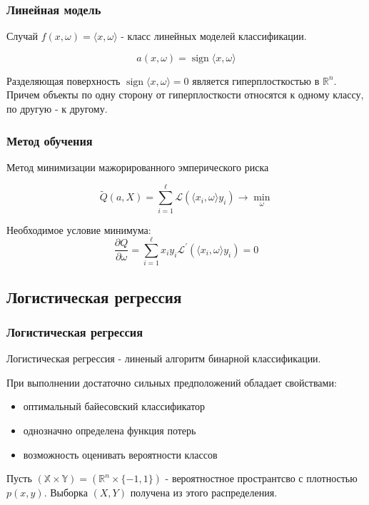 \documentclass{beamer}
\DeclareMathOperator{\sign}{sign}
\begin{document}
	\begin{frame}
		\frametitle{Линейная модель}
		
		Случай $f(x, \omega) = \langle x, \omega \rangle$ - класс линейных моделей классификации.
		
		\[
		a(x, \omega) = \sign \langle x, \omega \rangle
		\]
		
		Разделяющая поверхность $\sign \langle x, \omega \rangle = 0$ является гиперплосткостью в $\mathbb{R}^{n}$. Причем объекты по одну сторону от гиперплосткости относятся к одному классу, по другую - к другому.
	\end{frame}
	
	\begin{frame}
		\frametitle{Метод обучения}
		Метод минимизации мажорированного эмперического риска 
		
		\[
		\widetilde{Q}(a, X) = \sum_{i=1}^{\ell} \mathcal{L}(\langle x_i, \omega \rangle y_i) \rightarrow \min_{\omega}
		\]
		
		Необходимое условие минимума:
		\[
		\frac{\partial Q}{\partial \omega} = \sum_{i=1}^{\ell}  x_i y_i \mathcal{L}^{'}(\langle x_i, \omega \rangle y_i) = 0
		\]
	\end{frame}
	
	\subsection{Логистическая регрессия}
	
	\begin{frame}
		\frametitle{Логистическая регрессия}
		Логистическая регрессия - линеный алгоритм бинарной классификации.
		
		\vspace{15pt}
		
		При выполнении достаточно сильных предположений обладает свойствами:
		\begin{itemize}
			\item оптимальный байесовский классификатор
			\item однозначно определена функция потерь
			\item возможность оценивать вероятности классов
		\end{itemize}
		
		\vspace{15pt}
		
		Пусть $(\mathbb{X}\times \mathbb{Y}) = (\mathbb{R}^{n} \times \{-1, 1\})$ - вероятностное пространтсво с плотностью $p(x, y)$. Выборка $(X, Y)$ получена из этого распределения.
	\end{frame}
	
\end{document}
